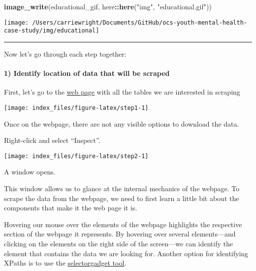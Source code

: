 \documentclass[
]{article}
\newenvironment{Shaded}{\begin{snugshade}}{\end{snugshade}}
\newcommand{\KeywordTok}[1]{\textcolor[rgb]{0.13,0.29,0.53}{\textbf{#1}}}
\newcommand{\NormalTok}[1]{#1}
\newcommand{\OperatorTok}[1]{\textcolor[rgb]{0.81,0.36,0.00}{\textbf{#1}}}
\newcommand{\StringTok}[1]{\textcolor[rgb]{0.31,0.60,0.02}{#1}}
\begin{document}
\begin{Shaded}
\begin{Highlighting}[]
\KeywordTok{image_write}\NormalTok{(educational_gif,}
\NormalTok{      here}\OperatorTok{::}\KeywordTok{here}\NormalTok{(}\StringTok{"img"}\NormalTok{, }\StringTok{"educational.gif"}\NormalTok{))}
\end{Highlighting}
\end{Shaded}

\begin{center}\texttt{[image: /Users/carriewright/Documents/GitHub/ocs-youth-mental-health-case-study/img/educational]} \end{center}

\begin{center}\rule{0.5\linewidth}{0.5pt}\end{center}

Now let's go through each step together:

\hypertarget{identify-location-of-data-that-will-be-scraped}{%
\paragraph{1) Identify location of data that will be
scraped}\label{identify-location-of-data-that-will-be-scraped}}

First, let's go to the
\href{https://www.samhsa.gov/data/sites/default/files/cbhsq-reports/NSDUHDetailedTabs2018R2/NSDUHDetTabsSect11pe2018.htm}{web
page} with all the tables we are interested in scraping

\begin{center}\texttt{[image: index\_files/figure-latex/step1-1]} \end{center}

Once on the webpage, there are not any visible options to download the
data.

Right-click and select ``Inspect''.

\begin{center}\texttt{[image: index\_files/figure-latex/step2-1]} \end{center}

A window opens.

This window allows us to glance at the internal mechanics of the
webpage. To scrape the data from the webpage, we need to first learn a
little bit about the components that make it the web page it is.

Hovering our mouse over the elements of the webpage highlights the
respective section of the webpage it represents. By hovering over
several elements---and clicking on the elements on the right side of the
screen---we can identify the element that contains the data we are
looking for. Another option for identifying XPaths is to use the
\href{https://cran.r-project.org/web/packages/rvest/vignettes/selectorgadget.html}{selectorgadget
tool}.
\end{document}
